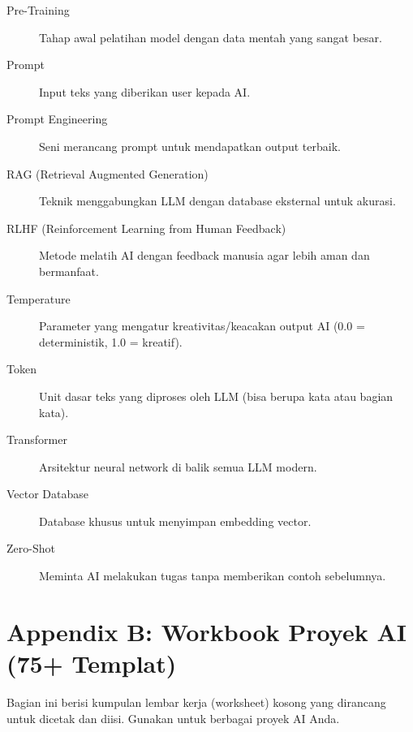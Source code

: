 \begin{description}
    \item[Pre-Training] Tahap awal pelatihan model dengan data mentah yang sangat besar.
    \item[Prompt] Input teks yang diberikan user kepada AI.
    \item[Prompt Engineering] Seni merancang prompt untuk mendapatkan output terbaik.
    \item[RAG (Retrieval Augmented Generation)] Teknik menggabungkan LLM dengan database eksternal untuk akurasi.
    \item[RLHF (Reinforcement Learning from Human Feedback)] Metode melatih AI dengan feedback manusia agar lebih aman dan bermanfaat.
    \item[Temperature] Parameter yang mengatur kreativitas/keacakan output AI (0.0 = deterministik, 1.0 = kreatif).
    \item[Token] Unit dasar teks yang diproses oleh LLM (bisa berupa kata atau bagian kata).
    \item[Transformer] Arsitektur neural network di balik semua LLM modern.
    \item[Vector Database] Database khusus untuk menyimpan embedding vector.
    \item[Zero-Shot] Meminta AI melakukan tugas tanpa memberikan contoh sebelumnya.
\end{description}

\chapter{Appendix B: Workbook Proyek AI (75+ Templat)}
\label{chap:appendix_b}

Bagian ini berisi kumpulan lembar kerja (worksheet) kosong yang dirancang untuk dicetak dan diisi. Gunakan untuk berbagai proyek AI Anda.

